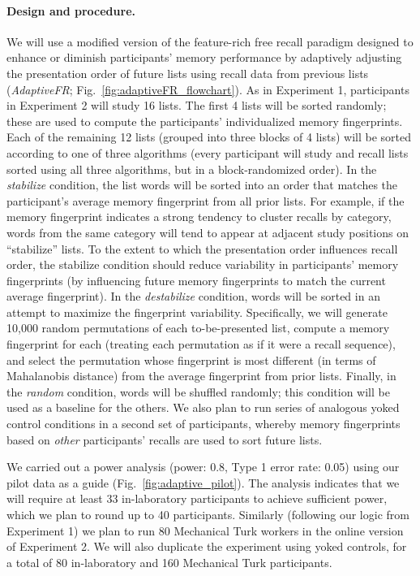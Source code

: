\paragraph{Design and procedure.} We will use a modified version of the feature-rich free recall paradigm designed to enhance or diminish participants' memory performance by adaptively adjusting the presentation order of future lists using recall data from previous lists (\textit{AdaptiveFR}; Fig.~\ref{fig:adaptiveFR_flowchart}).  As in Experiment 1, participants in Experiment 2 will study 16 lists.  The first 4 lists will be sorted randomly; these are used to compute the participants' individualized memory fingerprints.  Each of the remaining 12 lists (grouped into three blocks of 4 lists) will be sorted according to one of three algorithms (every participant will study and recall lists sorted using all three algorithms, but in a block-randomized order).   In the \textit{stabilize} condition, the list words will be sorted into an order that matches the participant's average memory fingerprint from all prior lists.  For example, if the memory fingerprint indicates a strong tendency to cluster recalls by category, words from the same category will tend to appear at adjacent study positions on ``stabilize'' lists.  To the extent to which the presentation order influences recall order, the stabilize condition should reduce variability in participants' memory fingerprints (by influencing future memory fingerprints to match the current average fingerprint). In the \textit{destabilize} condition, words will be sorted in an attempt to maximize the fingerprint variability.  Specifically, we will generate 10,000 random permutations of each to-be-presented list, compute a memory fingerprint for each (treating each permutation as if it were a recall sequence), and select the permutation whose fingerprint is most different (in terms of Mahalanobis distance) from the average fingerprint from prior lists.  Finally, in the \textit{random} condition, words will be shuffled randomly; this condition will be used as a baseline for the others.  We also plan to run series of analogous yoked control conditions in a second set of participants, whereby memory fingerprints based on \textit{other} participants' recalls are used to sort future lists.



We carried out a power analysis (power: 0.8, Type 1 error rate: 0.05) using our
pilot data as a guide (Fig.~\ref{fig:adaptive_pilot}). The analysis indicates
that we will require at least 33 in-laboratory participants to achieve
sufficient power, which we plan to round up to 40 participants. Similarly
(following our logic from Experiment 1) we plan to run 80 Mechanical Turk
workers in the online version of Experiment 2. We will also duplicate the
experiment using yoked controls, for a total of 80 in-laboratory and 160
Mechanical Turk participants.



